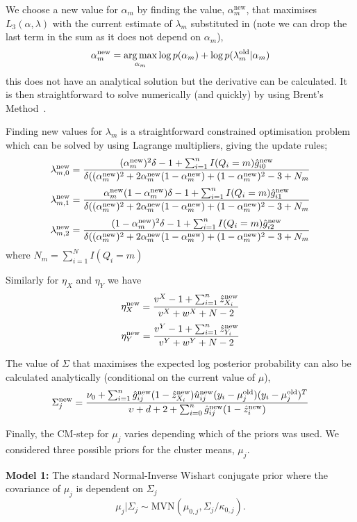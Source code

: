 We choose a new value for $\alpha_m$ by finding the value, $\alpha_m^{\textrm{new}}$, that maximises $L_3(\alpha,\lambda)$ with the current estimate of $\lambda_m$ substituted in (note we can drop the last term in the sum as it does not depend on $\alpha_m$),
$$\alpha_m^{\textrm{new}} = \operatorname*{arg\,max}_{\alpha_m} \log p(\alpha_m) + \log p(\lambda_m^\textrm{old}|\alpha_m)$$
this does not have an analytical solution but the derivative can be calculated.  It is then straightforward to solve numerically (and quickly) by using Brent's Method~\citep{brent2002algorithms}.

Finding new values for $\lambda_m$ is a straightforward constrained optimisation problem which can be solved by using Lagrange multipliers, giving the update rules;
$$\lambda_{m,0}^\textrm{new} = \frac{(\alpha_m^\textrm{new})^2 \delta -1 + \sum_{i=1}^n I(Q_i=m) \hat{g}^\textrm{new}_{i0}}{\delta((\alpha_m^\textrm{new})^2 + 2\alpha_m^\textrm{new}(1-\alpha_m^\textrm{new}) + (1-\alpha_m^\textrm{new})^2 - 3 + N_m}$$
$$\lambda_{m,1}^\textrm{new} = \frac{\alpha_m^\textrm{new}(1-\alpha_m^\textrm{new}) \delta -1 + \sum_{i=1}^n I(Q_i=m) \hat{g}^\textrm{new}_{i1}}{\delta((\alpha_m^\textrm{new})^2 + 2\alpha_m^\textrm{new}(1-\alpha_m^\textrm{new}) + (1-\alpha_m^\textrm{new})^2 - 3 + N_m}$$
$$\lambda_{m,2}^\textrm{new} = \frac{(1-\alpha_m^\textrm{new})^2 \delta -1 + \sum_{i=1}^n I(Q_i=m) \hat{g}^\textrm{new}_{i2}}{\delta((\alpha_m^\textrm{new})^2 + 2\alpha_m^\textrm{new}(1-\alpha_m^\textrm{new}) + (1-\alpha_m^\textrm{new})^2 - 3 + N_m}$$
where $N_m = \sum_{i=1}^NI(Q_i=m)$

Similarly for $\eta_X$ and $\eta_Y$ we have
$$\eta_X^\textrm{new} = \frac{v^X-1+\sum_{i=1}^n\hat{z}^\textrm{new}_{X_i}}{v^X+w^X+N-2}$$
$$\eta_Y^\textrm{new} = \frac{v^Y-1+\sum_{i=1}^n\hat{z}^\textrm{new}_{Y_i}}{v^Y+w^Y+N-2}$$

The value of $\Sigma$ that maximises the expected log posterior probability can also be calculated analytically (conditional on the current value of $\mu$),
$$\Sigma_j^\textrm{new} = \frac{\nu_0 + \sum_{i=1}^n \hat{g}^\textrm{new}_{ij}(1-\hat{z}^\textrm{new}_{X_i})\hat{u}^\textrm{new}_{ij}(y_i-\mu^\textrm{old}_j)(y_i-\mu^\textrm{old}_j)^T}{\upsilon + d + 2 + \sum_{i=0}^n\hat{g}^\textrm{new}_{ij}(1-\hat{z}^\textrm{new}_i)}$$

Finally, the CM-step for $\mu_j$ varies depending which of the priors was used.  We considered three possible priors for the cluster means, $\mu_j$. 

\textbf{Model 1\label{model1}:} The standard Normal-Inverse Wishart conjugate prior where the covariance of $\mu_j$ is dependent on $\Sigma_j$
\begin{equation}\label{model1} \mu_j|\Sigma_j \sim \textrm{MVN}(\mu_{0,j},\Sigma_j/\kappa_{0,j}).\nonumber\end{equation}

